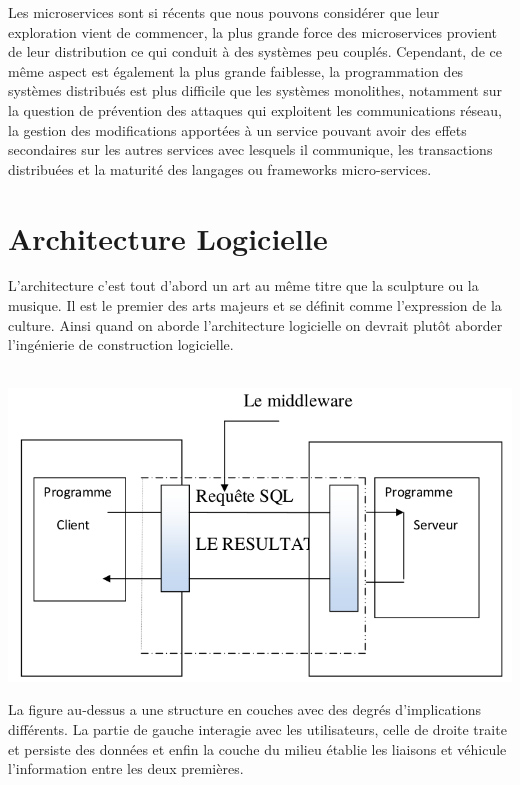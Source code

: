 \documentclass[12pt, a4paper, openany]{report}
\begin{document}
 Les microservices sont si récents que nous pouvons considérer que leur exploration vient de commencer, la plus grande force des microservices provient de leur distribution ce qui conduit à des systèmes peu couplés. Cependant, de ce même aspect est également la plus grande faiblesse, la programmation des systèmes distribués est plus difficile que les systèmes monolithes, notamment sur la question de prévention des attaques qui exploitent les communications réseau, la gestion des modifications apportées à un service pouvant avoir des effets secondaires sur les autres services avec lesquels il communique, les transactions distribuées et la maturité des langages ou frameworks micro-services. 
 



\chapter{Architecture Logicielle}
 L’architecture c’est tout d’abord un art au même titre que la sculpture ou la musique. Il est le premier des arts majeurs et se définit comme l’expression de la culture. Ainsi quand on aborde l’architecture logicielle on devrait plutôt aborder l’ingénierie de construction logicielle.\\ \\
 \begin{center}
   \includegraphics[scale=0.5]{exemple_archi_1.png}
   \label{fig1}
 \end{center}
 
 La figure au-dessus a une structure en couches avec des degrés d’implications différents. La partie de gauche interagie avec les utilisateurs, celle de droite traite et persiste des données et enfin la couche du milieu établie les liaisons  et véhicule l’information entre les deux premières.\\
 
\end{document}
